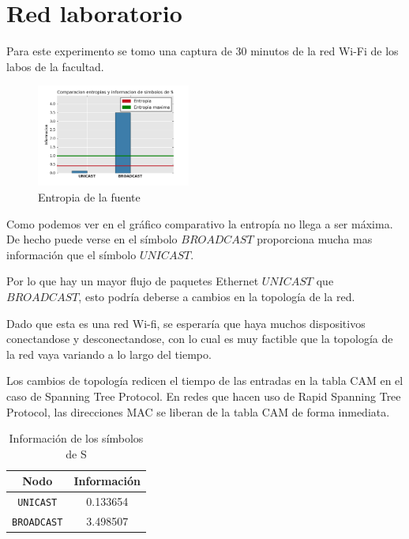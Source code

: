 \section{Red laboratorio}

Para este experimento se tomo una captura de 30 minutos de la red Wi-Fi de los labos de la facultad.

\begin{figure}[H]
  \centering
    \includegraphics[width=0.45\textwidth]{grafico1-red-labos.png}
  \caption{Entropia de la fuente}
  \label{entropia-s}
\end{figure}

Como podemos ver en el gráfico comparativo la entropía no llega a ser máxima. De hecho puede verse en el símbolo $BROADCAST$ proporciona mucha mas información que el símbolo $UNICAST$. 

Por lo que hay un mayor flujo de paquetes Ethernet $UNICAST$ que $BROADCAST$, esto podría deberse a cambios en la topología de la red.

Dado que esta es una red Wi-fi, se esperaría que haya muchos dispositivos conectandose y desconectandose, con lo cual es muy factible que la topología de la red vaya variando a lo largo del tiempo.

Los cambios de topología redicen el tiempo de las entradas en la tabla CAM en el caso de Spanning Tree Protocol. En redes que hacen uso de Rapid Spanning Tree Protocol, las direcciones MAC se liberan de la tabla CAM de forma inmediata.


    \begin{table}[ht]\begin{center}
      \begin{tabular}{|c|c|}
      \hline
      \textbf{Nodo} & \textbf{Información} \\ \hline
      \texttt{UNICAST}& 0.133654 \\ \hline
      \texttt{BROADCAST}& 3.498507 \\ \hline
      \end{tabular}
      \caption{Información de los símbolos de S}
      \label{info-simbolos}
    \end{center}\end{table}


